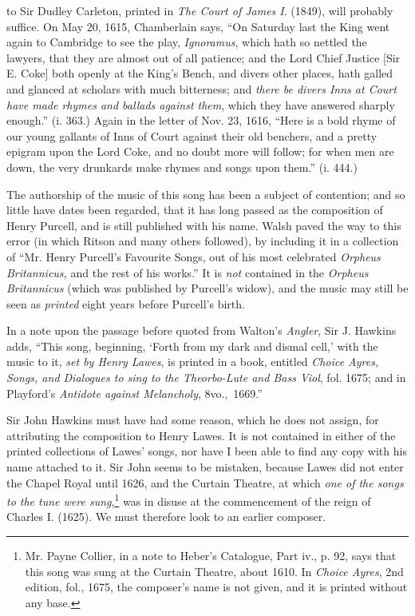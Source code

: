 to Sir Dudley Carleton, printed in \textit{The Court of James I}. (1849), will probably
suffice. On May 20, 1615, Chamberlain says, “On Saturday last the King went
again to Cambridge to see the play, \textit{Ignoramus}, which hath so nettled the lawyers,
that they are almost out of all patience; and the Lord Chief Justice [Sir E.
Coke] both openly at the King’s Bench, and divers other places, hath galled and
glanced at scholars with much bitterness; and \textit{there be divers Inns at Court have
made rhymes and ballads against them}, which they have answered sharply enough.”
(i. 363.) Again in the letter of Nov. 23, 1616, “Here is a bold rhyme of
our young gallants of Inns of Court against their old benchers, and a pretty
epigram upon the Lord Coke, and no doubt more will follow; for when men are
down, the very drunkards make rhymes and songs upon them.” (i. 444.)

The authorship of the music of this song has been a subject of contention; and
so little have dates been regarded, that it has long passed as the composition of
Henry Purcell, and is still published with his name. Walsh paved the way to
this error (in which Ritson and many others followed), by including it in
a collection of “Mr. Henry Purcell’s Favourite Songs, out of his most celebrated
\textit{Orpheus Britannicus,} and the rest of his works.” It is \textit{not} contained in
the \textit{Orpheus Britannicus} (which was published by Purcell’s widow), and the music
may still be seen as \textit{printed} eight years before Purcell’s birth.

In a note upon the passage before quoted from Walton’s \textit{Angler}, Sir J.
Hawkins adds, “This song, beginning, ‘Forth from my dark and dismal cell,’
with the music to it, \textit{set by Henry Lawes}, is printed in a book, entitled \textit{Choice
Ayres, Songs, and Dialogues to sing to the Theorbo-Lute and Bass Viol}, fol. 1675;
and in Playford’s \textit{Antidote against Melancholy}, 8vo.,~1669.”

\pagebreak

Sir John Hawkins must have had some reason, which he does not assign, for
attributing the composition to Henry Lawes. It is not contained in either of the
printed collections of Lawes’ songs, nor have I been able to find any copy with his
name attached to it. Sir John seems to be mistaken, because Lawes did not
enter the Chapel Royal until 1626, and the Curtain Theatre, at which \textit{one of the
songs to the tune were sung},\footnote{\textit{}
Mr. Payne Collier, in a note to Heber’s Catalogue,
Part iv., p. 92, says that this song was sung at the Curtain
Theatre, about 1610. In \textit{Choice Ayres}, 2nd edition, fol.,
1675, the composer’s name is not given, and it is printed
without any base.}
 was in disuse at the commencement of the reign of
Charles I. (1625). We must therefore look to an earlier composer.


